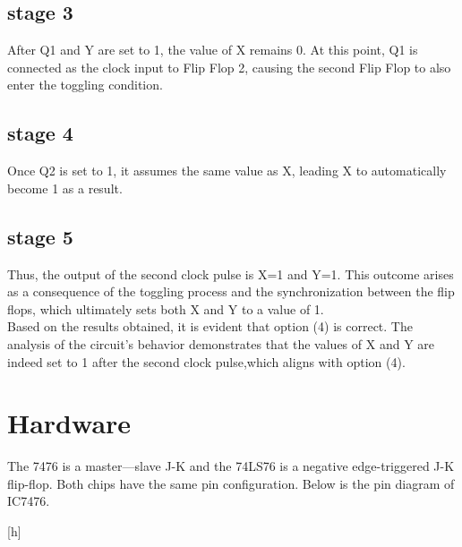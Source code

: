 \documentclass[journal,12pt]{article}
\begin{document}
\subsection{stage 3}
\begin{figure}[h]
	\centering
	
	\caption{}
\end{figure}
After Q1 and Y are set to 1, the value of X remains 0. At this point, Q1 is connected as the clock input to Flip Flop 2, causing the second Flip Flop to also enter the toggling condition.
\pagebreak
\subsection{stage 4}
\begin{figure}[h]
	\centering
	
	\caption{}
\end{figure}
Once Q2 is set to 1, it assumes the same value as X, leading X to automatically become 1 as a result.
\subsection{stage 5}
\begin{figure}[h]
	\centering
	
	\caption{}
\end{figure}
Thus, the output of the second clock pulse is X=1 and Y=1. This outcome arises as a consequence of the toggling process and the synchronization between the flip flops, which ultimately sets both X and Y to a value of 1.\\
Based on the results obtained, it is evident that option (4) is correct. The analysis of the circuit's behavior demonstrates that the values of X and Y are indeed set to 1 after the second clock pulse,which aligns with option (4).
\pagebreak

\section{Hardware}
The 7476 is a master—slave J-K and the 74LS76 is a negative edge-triggered J-K flip-flop. Both chips have the same pin configuration. Below is the pin diagram of IC7476. \\
\begin{center}[h]
	\centering
	
	\label{pindiagram.}
\end{center}
\end{document}

